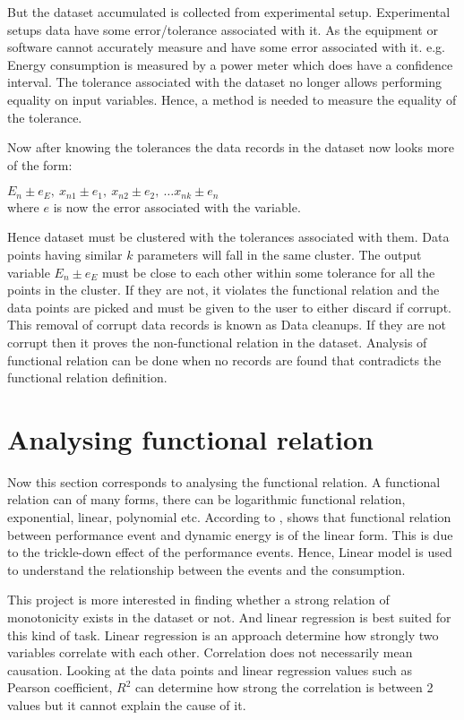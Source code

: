But the dataset accumulated is collected from experimental setup. Experimental setups data have some error/tolerance associated with it. As the equipment or software cannot accurately measure and have some error associated with it. e.g. Energy consumption is measured by a power meter which does have a confidence interval. The tolerance associated with the dataset no longer allows performing equality on input variables. Hence, a method is needed to measure the equality of the tolerance.

Now after knowing the tolerances the data records in the dataset now looks more of the form:

\(E_n \pm e_E,\ x_{n1} \pm e_1,\ x_{n2} \pm e_2,\ \ldots x_{nk} \pm e_n\)\\
where \(e\) is now the error associated with the variable.

Hence dataset must be clustered with the tolerances associated with them. Data points having similar \(k\) parameters will fall in the same cluster. The output variable \(E_n \pm e_E\) must be close to each other within some tolerance for all the points in the cluster. If they are not, it violates the functional relation and the data points are picked and must be given to the user to either discard if corrupt. This removal of corrupt data records is known as Data cleanups. If they are not corrupt then it proves the non-functional relation in the dataset. Analysis of functional relation can be done when no records are found that contradicts the functional relation definition.

\section{Analysing functional relation}

Now this section corresponds to analysing the functional relation. A functional relation can of many forms, there can be logarithmic functional relation, exponential, linear, polynomial etc. According to \cite{bircher2007complete}, shows that functional relation between performance event and dynamic energy is of the linear form. This is due to the trickle-down effect of the performance events. Hence, Linear model is used to understand the relationship between the events and the consumption. 

This project is more interested in finding whether a strong relation of monotonicity exists in the dataset or not. And linear regression is best suited for this kind of task. Linear regression is an approach determine how strongly two variables correlate with each other. Correlation does not necessarily mean causation. Looking at the data points and linear regression values such as Pearson coefficient, $R^2$ can determine how strong the correlation is between 2 values but it cannot explain the cause of it.

